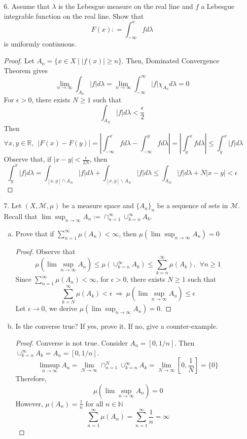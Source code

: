 \begin{itemize}
	\item[6.] Assume that $\lambda$ is the Lebesgue measure on the real line and $f$ a Lebesgue integrable
	function on the real line. Show that
	$$
	F(x): = \int_{-\infty}^x fd\lambda
	$$
	is uniformly continuous.
	\begin{proof}
		Let $A_n = \{x\in X\mid |f(x)|\ge n\}$. Then, Dominated Convergence Theorem gives
		$$
		\lim_{n\rightarrow \infty} \int_{A_n} |f|d\lambda = \lim_{n\rightarrow \infty} \int_{-\infty}^\infty |f|
		\chi_{A_n}d\lambda = 0 
		$$
		For $\epsilon >0$, there exists $N\ge 1$ such that 
		$$\int_{A_N} |f|d\lambda < \frac{\epsilon}{2}$$
		Then
		$$
		\forall x,y \in \mathbb{R},~~|F(x) - F(y)| = \left|\int_{-\infty}^x fd\lambda - \int_{-\infty}^y fd\lambda\right| = \left\lvert\int_y^x fd\lambda\right\rvert \le \int_y^x \left\lvert f \right\rvert d\lambda
		$$		
		Observe that, if $\lvert x-y\rvert < \frac{\epsilon}{2N}$, then
		$$
		 \int_y^x \left\lvert f \right\rvert d\lambda = \int_{[x,y]\cap A_N} \left\lvert f \right\rvert d\lambda + \int_{[x,y]\backslash A_N} |f| d\lambda \le \int_{A_N} |f| d\lambda + N |x-y| < \epsilon
		$$
	\end{proof}

	\item[7.] Let $(X,\mathcal{M}, \mu)$ be a measure space and $\{A_n\}_n$ be a sequence of sets in $\mathcal{M}$. Recall that
	$\lim \sup_{n\rightarrow \infty} A_n := \cap_{n=1}^\infty \cup_{k=n}^\infty A_k$.
	\begin{enumerate}[(a)]
		\item Prove that if $\sum_{n=1}^\infty
		\mu(A_n) < \infty$, then $\mu(\lim\sup_{n\rightarrow \infty}A_n ) = 0$
		\begin{proof}
			Observe that 
			$$
			\mu\left(\lim\sup_{n\rightarrow \infty}A_n \right)\le \mu\left(\cup_{k=n}^\infty A_k  \right) \le  \sum_{k=n}^\infty \mu(A_k), ~~\forall n\ge 1
			$$
			Since $\sum_{n=1}^\infty \mu(A_n) < \infty$, for $\epsilon > 0$, there exists $N\ge 1$ such that 
			$$
			\sum_{k=N}^\infty \mu(A_k) < \epsilon ~\Rightarrow~ 	\mu\left(\lim\sup_{n\rightarrow \infty}A_n \right)\le \epsilon
			$$
			Let $\epsilon \rightarrow 0$, we derive $	\mu\left(\lim\sup_{n\rightarrow \infty}A_n \right) = 0$.
		\end{proof}
		\item Is the converse true? If yes, prove it. If no, give a counter-example.
		\begin{proof}
			Converse is not true. Consider $A_n = [0, 1/n]$. Then $\cup_{k=n}^\infty A_k = A_n = [0, 1/n]$. 
			$$
			\limsup_{n\rightarrow \infty} A_n = \lim_{N\rightarrow \infty} \cap_{n=1}^N \cup_{k=n}^\infty A_k = \lim_{N\rightarrow \infty} \left[0, \frac{1}{N} \right] = \{0\}
			$$
			Therefore,
			$$
			\mu\left(\lim\sup_{n\rightarrow \infty}A_n \right) = 0
			$$
			However, $\mu(A_n) = \frac{1}{n}$ for all $n\in \mathbb{N}$
			$$
			\sum_{n=1}^\infty \mu(A_n) = \sum_{n=1}^\infty  \frac{1}{n} = \infty
			$$
		\end{proof}
	\end{enumerate}


\end{itemize}

